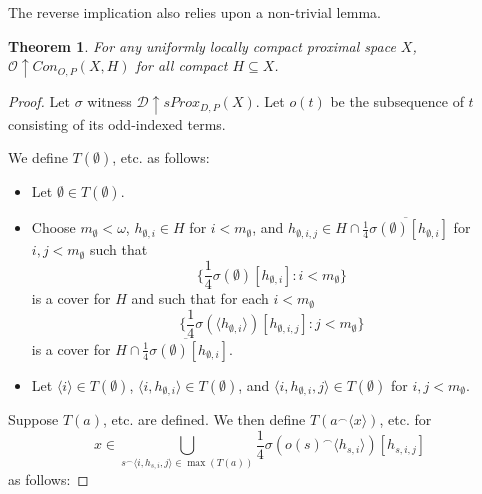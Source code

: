 \documentclass{amsart}
\newtheorem{thm}{Theorem}[section]
\theoremstyle{definition}
\theoremstyle{remark}
\newcommand{\<}{\langle}
\renewcommand{\>}{\rangle}
\newcommand{\cl}[1]{\overline{#1}}
\newcommand{\sproxgame}[1]{sProx_{D,P}(#1)}
\newcommand{\congame}[2]{Con_{O,P}(#1,#2)}
\newcommand{\pl}[1]{\mathscr{#1}}
\newcommand{\win}{\uparrow}
\newcommand{\concat}{^\frown}
\begin{document}
The reverse implication also relies upon a non-trivial lemma.

\begin{thm}
  For any uniformly locally compact proximal space $X$, $\pl O\win \congame{X}{H}$ for all compact $H\subseteq X$.
\end{thm}

\begin{proof}
  Let $\sigma$ witness $\pl D \win \sproxgame{X}$. Let $o(t)$ be the subsequence of $t$ consisting of its odd-indexed terms.

  We define $T(\emptyset)$, etc. as follows:

  \begin{itemize}
    \item Let $\emptyset\in T(\emptyset)$.
    \item Choose $m_\emptyset<\omega$, $h_{\emptyset,i}\in H$ for $i<m_\emptyset$, and $h_{\emptyset,i,j}\in H\cap\cl{\frac{1}{4}\sigma(\emptyset)[h_{\emptyset,i}]}$ for $i,j<m_\emptyset$ such that
      \[
        \{\frac{1}{4}\sigma(\emptyset)[h_{\emptyset,i}]:i<m_\emptyset\}
      \]
    is a cover for $H$ and such that for each $i<m_\emptyset$
      \[
        \{\frac{1}{4}\sigma(\<h_{\emptyset,i}\>)[h_{\emptyset,i,j}]:j<m_\emptyset\}
      \]
    is a cover for $H\cap\cl{\frac{1}{4}\sigma(\emptyset)[h_{\emptyset,i}]}$.
    \item Let $\<i\>\in T(\emptyset)$, $\<i,h_{\emptyset,i}\>\in T(\emptyset)$, and $\<i,h_{\emptyset,i},j\>\in T(\emptyset)$ for $i,j<m_\emptyset$.
  \end{itemize}

  Suppose $T(a)$, etc. are defined. We then define $T(a\concat\<x\>)$, etc. for
    \[
      x\in \bigcup_{s\concat\<i,h_{s,i},j\>\in\max(T(a))} \frac{1}{4}\sigma(o(s)\concat\<h_{s,i}\>)[h_{s,i,j}]
    \]
  as follows:


\end{proof}
\end{document}

